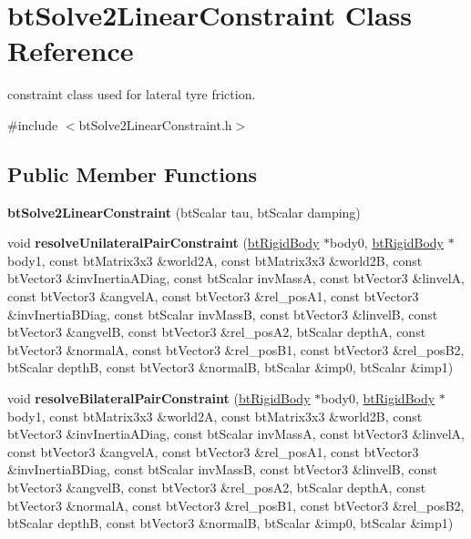 \hypertarget{classbtSolve2LinearConstraint}{}\section{bt\+Solve2\+Linear\+Constraint Class Reference}
\label{classbtSolve2LinearConstraint}


constraint class used for lateral tyre friction.  




{\ttfamily \#include $<$bt\+Solve2\+Linear\+Constraint.\+h$>$}

\subsection*{Public Member Functions}
\begin{DoxyCompactItemize}
\item 
\mbox{\label{classbtSolve2LinearConstraint_a69f16e10c3f4d30be471deedd7a2c7ff}} 
{\bfseries bt\+Solve2\+Linear\+Constraint} (bt\+Scalar tau, bt\+Scalar damping)
\item 
\mbox{\label{classbtSolve2LinearConstraint_af9e0bed2969536107cef14aa07dfef63}} 
void {\bfseries resolve\+Unilateral\+Pair\+Constraint} (\hyperlink{classbtRigidBody}{bt\+Rigid\+Body} $\ast$body0, \hyperlink{classbtRigidBody}{bt\+Rigid\+Body} $\ast$body1, const bt\+Matrix3x3 \&world2A, const bt\+Matrix3x3 \&world2B, const bt\+Vector3 \&inv\+Inertia\+A\+Diag, const bt\+Scalar inv\+MassA, const bt\+Vector3 \&linvelA, const bt\+Vector3 \&angvelA, const bt\+Vector3 \&rel\+\_\+pos\+A1, const bt\+Vector3 \&inv\+Inertia\+B\+Diag, const bt\+Scalar inv\+MassB, const bt\+Vector3 \&linvelB, const bt\+Vector3 \&angvelB, const bt\+Vector3 \&rel\+\_\+pos\+A2, bt\+Scalar depthA, const bt\+Vector3 \&normalA, const bt\+Vector3 \&rel\+\_\+pos\+B1, const bt\+Vector3 \&rel\+\_\+pos\+B2, bt\+Scalar depthB, const bt\+Vector3 \&normalB, bt\+Scalar \&imp0, bt\+Scalar \&imp1)
\item 
\mbox{\label{classbtSolve2LinearConstraint_a65e9392ff0210dee03ae4503b5a9f9b0}} 
void {\bfseries resolve\+Bilateral\+Pair\+Constraint} (\hyperlink{classbtRigidBody}{bt\+Rigid\+Body} $\ast$body0, \hyperlink{classbtRigidBody}{bt\+Rigid\+Body} $\ast$body1, const bt\+Matrix3x3 \&world2A, const bt\+Matrix3x3 \&world2B, const bt\+Vector3 \&inv\+Inertia\+A\+Diag, const bt\+Scalar inv\+MassA, const bt\+Vector3 \&linvelA, const bt\+Vector3 \&angvelA, const bt\+Vector3 \&rel\+\_\+pos\+A1, const bt\+Vector3 \&inv\+Inertia\+B\+Diag, const bt\+Scalar inv\+MassB, const bt\+Vector3 \&linvelB, const bt\+Vector3 \&angvelB, const bt\+Vector3 \&rel\+\_\+pos\+A2, bt\+Scalar depthA, const bt\+Vector3 \&normalA, const bt\+Vector3 \&rel\+\_\+pos\+B1, const bt\+Vector3 \&rel\+\_\+pos\+B2, bt\+Scalar depthB, const bt\+Vector3 \&normalB, bt\+Scalar \&imp0, bt\+Scalar \&imp1)

\end{DoxyCompactItemize}
